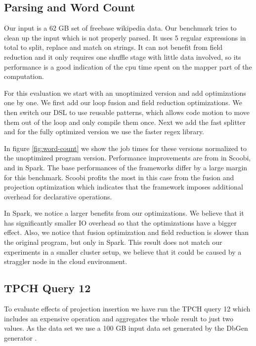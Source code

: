 \subsection{Parsing and Word Count}
\label{subsec:parsing-word-count}
Our input is a 62 GB set of freebase wikipedia data. Our benchmark tries to clean up the input which is not properly parsed. It uses 5 regular expressions in total to split, replace and match on strings. It can not benefit from field reduction and it only requires one shuffle stage with little data involved, so its performance is a good indication of the cpu time spent on the mapper part of the computation.

For this evaluation we start with an unoptimized version and add optimizations one by one. We first add our loop fusion and field reduction optimizations. We then switch our DSL to use reusable patterns, which allows code motion to move them out of the loop and only compile them once. Next we add the fast splitter and for the fully optimized version we use the faster regex library. 

In figure \ref{fig:word-count} we show the job times for these versions normalized to the unoptimized program version. Performance improvements are from  in Scoobi,  and in Spark. The base performances of the frameworks differ by a large margin for this benchmark. Scoobi profits the most in this case from the fusion and projection optimization which indicates that the framework imposes additional overhead for declarative operations.

In Spark, we notice a larger benefits from our optimizations. We believe that it has significantly smaller IO overhead so that the optimizations have a bigger effect. Also, we notice that fusion optimization and field reduction is slower than the original program, but only in Spark. This result does not match our experiments in a smaller cluster setup, we believe that it could be caused by a straggler node in the cloud environment.

\subsection{TPCH Query 12}
\label{subsec:tpch-query-12}

To evaluate effects of projection insertion we have run the TPCH \cite{tpch} query 12  which includes an expensive  operation and aggregates the whole result to just two values. As the data set we use a 100 GB input data set generated by the DbGen generator \cite{tpch}.

